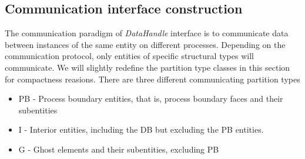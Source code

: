 \subsection{Communication interface construction}
\label{impl-grid-constructor-comm}

The communication paradigm of \dune{} \textit{DataHandle} interface is to communicate data between instances of the same entity on different processes. Depending on the communication protocol, only entities of specific structural types will communicate. We will slightly redefine the partition type classes in this section for compactness reasions. There are three different communicating partition types
\begin{itemize}
	\item PB - Process boundary entities, that is, process boundary faces and their subentities
	\item I - Interior entities, including the DB but excluding the PB entities.
	\item G - Ghost elements and their subentities, excluding PB
\end{itemize}


